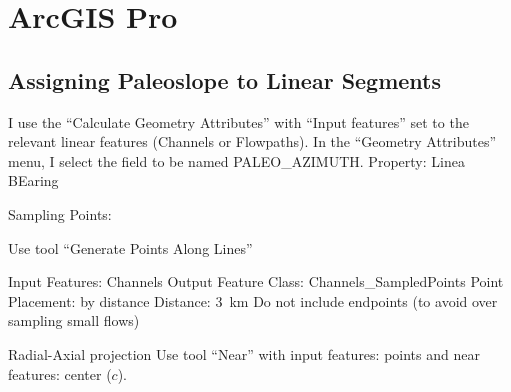 \chapter{ArcGIS Pro}

\section{Assigning Paleoslope to Linear Segments}

I use the ``Calculate Geometry Attributes'' with ``Input features'' set to the relevant linear features (Channels or Flowpaths). In the ``Geometry Attributes'' menu, I select the field to be named PALEO\_AZIMUTH. Property: Linea BEaring

Sampling Points:

Use tool ``Generate Points Along Lines''

Input Features: Channels
Output Feature Class: Channels\_SampledPoints
Point Placement: by distance
Distance: \qty{3}{\km}
Do not include endpoints (to avoid over sampling small flows)

Radial-Axial projection
Use tool ``Near'' with input features: points and near features: center ($c$).